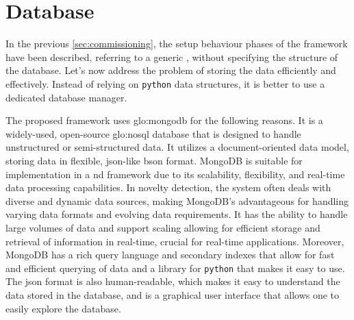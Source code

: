
\section{Database}
\label{sec:Database}
In the previous \autoref{sec:commissioning}, the setup behaviour phases of the framework have been described, referring to a generic , without specifying the structure of the database. Let's now address the problem of storing the data efficiently and effectively. Instead of relying on \texttt{python} data structures, it is better to use a dedicated database manager.

The proposed framework uses \gls{glo:mongodb} for the following reasons. It is a widely-used, open-source \gls{glo:nosql} database that is designed to handle unstructured or semi-structured data. It utilizes a document-oriented data model, storing data in flexible, \gls{json}-like \gls{bson} format. MongoDB is suitable for implementation in a \gls{nd} framework due to its scalability, flexibility, and real-time data processing capabilities. In novelty detection, the system often deals with diverse and dynamic data sources, making MongoDB's  advantageous for handling varying data formats and evolving data requirements. It has the ability to handle large volumes of data and support scaling allowing for efficient storage and retrieval of information in real-time, crucial for real-time applications. Moreover, MongoDB has a rich query language and secondary indexes that allow for fast and efficient querying of data and a library for \texttt{python} that makes it easy to use.
The \gls{json} format is also human-readable, which makes it easy to understand the data stored in the database, and  is a graphical user interface that allows one to easily explore the database.

